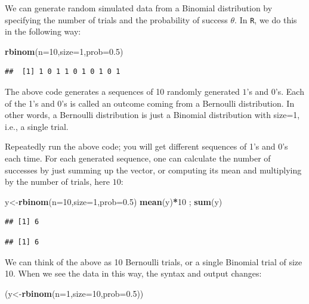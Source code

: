 \documentclass[12pt,]{krantz}
\newenvironment{Shaded}{\begin{snugshade}}{\end{snugshade}}
\newcommand{\DataTypeTok}[1]{\textcolor[rgb]{0.13,0.29,0.53}{#1}}
\newcommand{\DecValTok}[1]{\textcolor[rgb]{0.00,0.00,0.81}{#1}}
\newcommand{\FloatTok}[1]{\textcolor[rgb]{0.00,0.00,0.81}{#1}}
\newcommand{\KeywordTok}[1]{\textcolor[rgb]{0.13,0.29,0.53}{\textbf{#1}}}
\newcommand{\NormalTok}[1]{#1}
\newcommand{\OperatorTok}[1]{\textcolor[rgb]{0.81,0.36,0.00}{\textbf{#1}}}
\begin{document}
We can generate random simulated data from a Binomial distribution by specifying the number of trials and the probability of success \(\theta\). In \texttt{R}, we do this in the following way:

\begin{Shaded}
\begin{Highlighting}[]
\KeywordTok{rbinom}\NormalTok{(}\DataTypeTok{n=}\DecValTok{10}\NormalTok{,}\DataTypeTok{size=}\DecValTok{1}\NormalTok{,}\DataTypeTok{prob=}\FloatTok{0.5}\NormalTok{)}
\end{Highlighting}
\end{Shaded}

\begin{verbatim}
##  [1] 1 0 1 1 0 1 0 1 0 1
\end{verbatim}

The above code generates a sequences of 10 randomly generated \(1\)'s and \(0\)'s. Each of the 1's and 0's is called an outcome coming from a Bernoulli distribution. In other words, a Bernoulli distribution is just a Binomial distribution with size=1, i.e., a single trial.

Repeatedly run the above code; you will get different sequences of 1's and 0's each time. For each generated sequence, one can calculate the number of successes by just summing up the vector, or computing its mean and multiplying by the number of trials, here \(10\):

\begin{Shaded}
\begin{Highlighting}[]
\NormalTok{y<-}\KeywordTok{rbinom}\NormalTok{(}\DataTypeTok{n=}\DecValTok{10}\NormalTok{,}\DataTypeTok{size=}\DecValTok{1}\NormalTok{,}\DataTypeTok{prob=}\FloatTok{0.5}\NormalTok{)}
\KeywordTok{mean}\NormalTok{(y)}\OperatorTok{*}\DecValTok{10}\NormalTok{ ; }\KeywordTok{sum}\NormalTok{(y)}
\end{Highlighting}
\end{Shaded}

\begin{verbatim}
## [1] 6
\end{verbatim}

\begin{verbatim}
## [1] 6
\end{verbatim}

We can think of the above as 10 Bernoulli trials, or a single Binomial trial of size 10. When we see the data in this way, the syntax and output changes:

\begin{Shaded}
\begin{Highlighting}[]
\NormalTok{(y<-}\KeywordTok{rbinom}\NormalTok{(}\DataTypeTok{n=}\DecValTok{1}\NormalTok{,}\DataTypeTok{size=}\DecValTok{10}\NormalTok{,}\DataTypeTok{prob=}\FloatTok{0.5}\NormalTok{))}
\end{Highlighting}
\end{Shaded}
\end{document}
